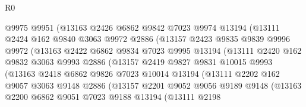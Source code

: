 \begin{lexlean}{R0}
\begin{coremodule}
                    @9975
                    @9951
                    (@13163
                      @2426
                      @6862
                      @9842
                      @7023
                      @9974
                      @13194
                      (@13111
                        @2424
                        @162
                        @9840
                        @3063
                        @9972
                        @2886
                        (@13157
                          @2423
                          @9835
                          @9839
                          @9996
                          @9972
                          (@13163
                            @2422
                            @6862
                            @9834
                            @7023
                            @9995
                            @13194
                            (@13111
                              @2420
                              @162
                              @9832
                              @3063
                              @9993
                              @2886
                              (@13157
                                @2419
                                @9827
                                @9831
                                @10015
                                @9993
                                (@13163
                                  @2418
                                  @6862
                                  @9826
                                  @7023
                                  @10014
                                  @13194
                                  (@13111
                                    @2202
                                    @162
                                    @9057
                                    @3063
                                    @9148
                                    @2886
                                    (@13157
                                      @2201
                                      @9052
                                      @9056
                                      @9189
                                      @9148
                                      (@13163
                                        @2200
                                        @6862
                                        @9051
                                        @7023
                                        @9188
                                        @13194
                                        (@13111
                                          @2198

\end{coremodule}
\end{lexlean}

